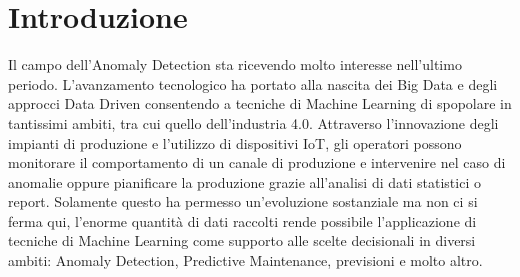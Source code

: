 \chapter{Introduzione}
\label{chap:first-chapter-intro}
Il campo dell'Anomaly Detection sta ricevendo molto interesse nell'ultimo periodo. L'avanzamento tecnologico ha portato alla nascita dei Big Data e degli approcci Data Driven consentendo a tecniche di Machine Learning di spopolare in tantissimi ambiti, tra cui quello dell'industria 4.0.
Attraverso l'innovazione degli impianti di produzione e l'utilizzo di dispositivi IoT, gli operatori possono monitorare il comportamento di un canale di produzione e intervenire nel caso di anomalie oppure pianificare la produzione grazie all'analisi di dati statistici o report.
Solamente questo ha permesso un'evoluzione sostanziale ma non ci si ferma qui, l'enorme quantità di dati raccolti rende possibile l'applicazione di tecniche di Machine Learning come supporto alle scelte decisionali in diversi ambiti: Anomaly Detection, Predictive Maintenance, previsioni e molto altro.

